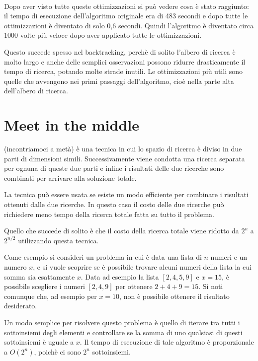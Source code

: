 ~\\
Dopo aver visto tutte queste ottimizzazioni
si può vedere cosa è stato raggiunto: il
tempo di esecuzione dell'algoritmo originale era di
483 secondi e dopo tutte le ottimizzazioni è diventato di
solo 0,6 secondi. Quindi l'algoritmo è diventato circa 
1000 volte più veloce dopo aver applicato tutte le ottimizzazioni.

Questo succede spesso nel backtracking,
perchè di solito l'albero di ricerca è molto
largo e anche delle semplici osservazioni
possono ridurre drasticamente il tempo di ricerca,
potando molte strade inutili.
Le ottimizzazioni più utili sono quelle che avvengono 
nei primi passaggi dell'algoritmo, cioè nella parte alta 
dell'albero di ricerca.

\section{Meet in the middle}


 (incontriamoci a metà) 
è una tecnica in cui lo spazio di ricerca è diviso in
due parti di dimensioni simili.
Successivamente viene condotta una ricerca 
separata per ognuna di queste due parti
e infine i risultati delle due ricerche sono combinati
per arrivare alla soluzione totale.

La tecnica può essere usata 
se esiste un modo efficiente per combinare
i risultati ottenuti dalle due ricerche.
In questo caso il costo delle due ricerche 
può richiedere meno tempo della ricerca totale
fatta su tutto il problema.

Quello che succede di solito è che il costo della ricerca 
totale viene ridotto da  $2^n$ a $2^{n/2}$ utilizzando
questa tecnica.

Come esempio si consideri un problema in cui è data una lista
di $n$ numeri e un numero $x$,
e si vuole scoprire se è possibile trovare 
alcuni numeri della lista la cui somma sia
esattamente $x$.
Data ad esempio la lista $[2,4,5,9]$ e $x=15$,
è possibile scegliere i numeri $[2,4,9]$ per ottenere $2+4+9=15$.
Si noti comunque  che, ad esempio per $x=10$, non è possibile 
ottenere il risultato desiderato.

Un modo semplice per risolvere questo problema è 
quello di iterare tra tutti i sottoinsiemi degli elementi
e controllare se la somma di uno qualsiasi di questi sottoinsiemi
è uguale a $x$.
Il tempo di esecuzione di tale algoritmo è proporzionale a $O(2^n)$,
poichè ci sono $2^n$ sottoinsiemi.

